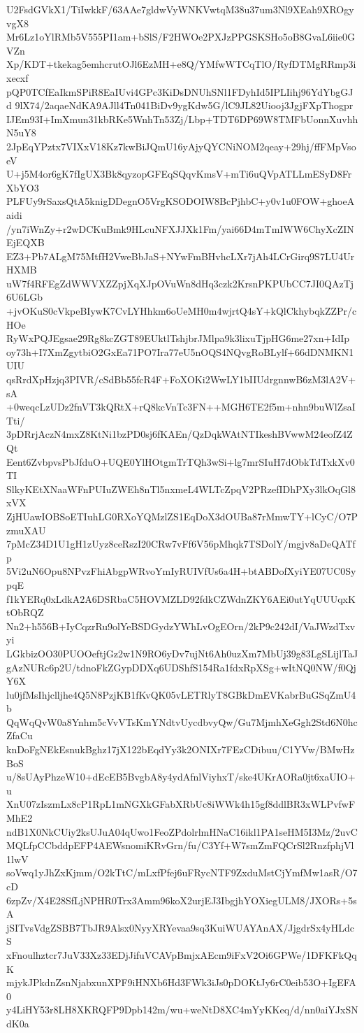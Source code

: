 U2FsdGVkX1/TiIwkkF/63AAe7gldwVyWNKVwtqM38u37um3Nl9XEah9XROgyvgX8
Mr6Lz1oYlRMb5V555PI1am+bSlS/F2HWOe2PXJzPPGSKSHo5oB8GvaL6iie0GVZn
Xp/KDT+tkekag5emhcrutOJl6EzMH+e8Q/YMfwWTCqTlO/RyfDTMgRRmp3ixecxf
pQP0TCfEaIkmSPiR8EaIUvi4GPc3KiDsDNUhSNl1FDyhId5IPLIihj96YdYbgGJd
9lX74/2aqaeNdKA9AJll4Tn041BiDv9ygKdw5G/lC9JL82Uiooj3JgjFXpThogpr
IJEm93I+ImXmun31kbRKe5WnhTn53Zj/Lbp+TDT6DP69W8TMFbUonnXuvhhN5uY8
2JpEqYPztx7VIXxV18Kz7kwBiJQmU16yAjyQYCNiNOM2qeay+29hj/ffFMpVsoeV
U+j5M4or6gK7fIgUX3Bk8qyzopGFEqSQqvKmsV+mTi6uQVpATLLmESyD8FrXbYO3
PLFUy9rSaxsQtA5knigDDegnO5VrgKSODOIW8BcPjhbC+y0v1u0FOW+ghoeAaidi
/yn7iWnZy+r2wDCKuBmk9HLcuNFXJJXk1Fm/yai66D4mTmIWW6ChyXcZINEjEQXB
EZ3+Pb7ALgM75MtfH2VweBbJaS+NYwFmBHvhcLXr7jAh4LCrGirq9S7LU4UrHXMB
uW7f4RFEgZdWWVXZZpjXqXJpOVuWn8dHq3czk2KrsnPKPUbCC7JI0QAzTj6U6LGb
+jvOKuS0cVkpeBIywK7CvLYHhkm6oUeMH0m4wjrtQ4sY+kQlCkhybqkZZPr/cHOe
RyWxPQJEgsae29Rg8kcZGT89EUktlTshjbrJMlpa9k3lixuTjpHG6me27xn+IdIp
oy73h+I7XmZgytbiO2GxEa71PO7Ira77eU5nOQS4NQvgRoBLylf+66dDNMKN1UIU
qsRrdXpHzjq3PIVR/cSdBb55fcR4F+FoXOKi2WwLY1bIIUdrgnnwB6zM3lA2V+sA
+0weqcLzUDz2fnVT3kQRtX+rQ8kcVnTc3FN++MGH6TE2f5m+nhn9buWlZsaITti/
3pDRrjAczN4mxZ8KtNi1bzPD0sj6fKAEn/QzDqkWAtNTIkeshBVwwM24eofZ4ZQt
Eent6ZvbpvsPbJfduO+UQE0YlHOtgmTrTQh3wSi+lg7mrSIuH7dObkTdTxkXv0TI
SlkyKEtXNaaWFnPUIuZWEh8nTl5nxmeL4WLTcZpqV2PRzefIDhPXy3lkOqGl8xVX
ZjHUawIOBSoETIuhLG0RXoYQMzlZS1EqDoX3dOUBa87rMmwTY+lCyC/O7PzmuXAU
7pMcZ34D1U1gH1zUyz8ceRszI20CRw7vFf6V56pMhqk7TSDolY/mgjv8aDeQATfp
5Vi2uN6Opu8NPvzFhiAbgpWRvoYmIyRUIVfUs6a4H+btABDofXyiYE07UC0SypqE
f1kYERq0xLdkA2A6DSRbaC5HOVMZLD92fdkCZWdnZKY6AEi0utYqUUUqxKtObRQZ
Nn2+h556B+IyCqzrRu9olYeBSDGydzYWhLvOgEOrn/2kP9c242dI/VaJWzdTxvyi
LGkbizOO30PUOOeftjGz2w1N9RO6yDv7ujNt6Ah0uzXm7MbUj39g83LgSLijlTaJ
gAzNURc6p2U/tdnoFkZGypDDXq6UDShfS154Ra1fdxRpXSg+wItNQ0NW/f0QjY6X
lu0jfMsIhjclljhe4Q5N8PzjKB1fKvQK05vLETRlyT8GBkDmEVKabrBuGSqZmU4b
QqWqQvW0a8Ynhm5cVvVTsKmYNdtvUycdbvyQw/Gu7MjmhXeGgh2Std6N0hcZfaCu
knDoFgNEkEsnukBghz17jX122bEqdYy3k2ONIXr7FEzCDibuu/C1YVw/BMwHzBoS
u/8sUAyPhzeW10+dEcEB5BvgbA8y4ydAfnlViyhxT/ske4UKrAORa0jt6xaUIO+u
XnU07zIszmLx8cP1RpL1mNGXkGFabXRbUc8iWWk4h15gf8ddlBR3xWLPvfwFMhE2
ndB1X0NkCUiy2ksUJuA04qUwo1FeoZPdolrlmHNaC16ikl1PA1seHM5I3Mz/2uvC
MQLfpCCbddpEFP4AEWsnomiKRvGrn/fu/C3Yf+W7smZmFQCrSl2RnzfphjVl1lwV
soVwq1yJhZxKjmm/O2kTtC/mLxfPfej6uFRycNTF9ZxduMstCjYmfMw1asR/O7cD
6zpZv/X4E28SfLjNPHR0Trx3Amm96koX2urjEJ3IbgjhYOXiegULM8/JXORs+5sA
jSITvsVdgZSBB7TbJR9Alsx0NyyXRYevaa9sq3KuiWUAYAnAX/JjgdrSx4yHLdcS
xFnoulhztcr7JuV33Xz33EDjJifuVCAVpBmjxAEcm9iFxV2Oi6GPWe/1DFKFkQqK
mjykJPkdnZsnNjabxunXPF9iHNXb6Hd3FWk3iJs0pDOKtJy6rC0eib53O+IgEFA0
y4LiHY53r8LH8XKRQFP9Dpb142m/wu+weNtD8XC4mYyKKeq/d/nn0aiYJxSNdK0a
